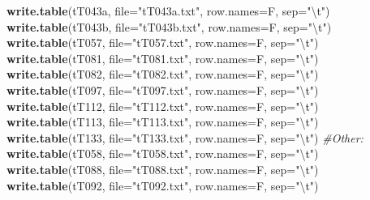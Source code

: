 \documentclass[
]{article}
\newenvironment{Shaded}{\begin{snugshade}}{\end{snugshade}}
\newcommand{\CharTok}[1]{\textcolor[rgb]{0.31,0.60,0.02}{#1}}
\newcommand{\CommentTok}[1]{\textcolor[rgb]{0.56,0.35,0.01}{\textit{#1}}}
\newcommand{\DataTypeTok}[1]{\textcolor[rgb]{0.13,0.29,0.53}{#1}}
\newcommand{\KeywordTok}[1]{\textcolor[rgb]{0.13,0.29,0.53}{\textbf{#1}}}
\newcommand{\NormalTok}[1]{#1}
\newcommand{\StringTok}[1]{\textcolor[rgb]{0.31,0.60,0.02}{#1}}
\begin{document}
\begin{Shaded}
\begin{Highlighting}[]
\KeywordTok{write.table}\NormalTok{(tT043a, }\DataTypeTok{file=}\StringTok{"tT043a.txt"}\NormalTok{, }\DataTypeTok{row.names=}\NormalTok{F, }\DataTypeTok{sep=}\StringTok{"}\CharTok{\textbackslash{}t}\StringTok{"}\NormalTok{)}
\KeywordTok{write.table}\NormalTok{(tT043b, }\DataTypeTok{file=}\StringTok{"tT043b.txt"}\NormalTok{, }\DataTypeTok{row.names=}\NormalTok{F, }\DataTypeTok{sep=}\StringTok{"}\CharTok{\textbackslash{}t}\StringTok{"}\NormalTok{)}
\KeywordTok{write.table}\NormalTok{(tT057, }\DataTypeTok{file=}\StringTok{"tT057.txt"}\NormalTok{, }\DataTypeTok{row.names=}\NormalTok{F, }\DataTypeTok{sep=}\StringTok{"}\CharTok{\textbackslash{}t}\StringTok{"}\NormalTok{)}
\KeywordTok{write.table}\NormalTok{(tT081, }\DataTypeTok{file=}\StringTok{"tT081.txt"}\NormalTok{, }\DataTypeTok{row.names=}\NormalTok{F, }\DataTypeTok{sep=}\StringTok{"}\CharTok{\textbackslash{}t}\StringTok{"}\NormalTok{)}
\KeywordTok{write.table}\NormalTok{(tT082, }\DataTypeTok{file=}\StringTok{"tT082.txt"}\NormalTok{, }\DataTypeTok{row.names=}\NormalTok{F, }\DataTypeTok{sep=}\StringTok{"}\CharTok{\textbackslash{}t}\StringTok{"}\NormalTok{)}
\KeywordTok{write.table}\NormalTok{(tT097, }\DataTypeTok{file=}\StringTok{"tT097.txt"}\NormalTok{, }\DataTypeTok{row.names=}\NormalTok{F, }\DataTypeTok{sep=}\StringTok{"}\CharTok{\textbackslash{}t}\StringTok{"}\NormalTok{)}
\KeywordTok{write.table}\NormalTok{(tT112, }\DataTypeTok{file=}\StringTok{"tT112.txt"}\NormalTok{, }\DataTypeTok{row.names=}\NormalTok{F, }\DataTypeTok{sep=}\StringTok{"}\CharTok{\textbackslash{}t}\StringTok{"}\NormalTok{)}
\KeywordTok{write.table}\NormalTok{(tT113, }\DataTypeTok{file=}\StringTok{"tT113.txt"}\NormalTok{, }\DataTypeTok{row.names=}\NormalTok{F, }\DataTypeTok{sep=}\StringTok{"}\CharTok{\textbackslash{}t}\StringTok{"}\NormalTok{)}
\KeywordTok{write.table}\NormalTok{(tT133, }\DataTypeTok{file=}\StringTok{"tT133.txt"}\NormalTok{, }\DataTypeTok{row.names=}\NormalTok{F, }\DataTypeTok{sep=}\StringTok{"}\CharTok{\textbackslash{}t}\StringTok{"}\NormalTok{)}
\CommentTok{#Other:}
\KeywordTok{write.table}\NormalTok{(tT058, }\DataTypeTok{file=}\StringTok{"tT058.txt"}\NormalTok{, }\DataTypeTok{row.names=}\NormalTok{F, }\DataTypeTok{sep=}\StringTok{"}\CharTok{\textbackslash{}t}\StringTok{"}\NormalTok{)}
\KeywordTok{write.table}\NormalTok{(tT088, }\DataTypeTok{file=}\StringTok{"tT088.txt"}\NormalTok{, }\DataTypeTok{row.names=}\NormalTok{F, }\DataTypeTok{sep=}\StringTok{"}\CharTok{\textbackslash{}t}\StringTok{"}\NormalTok{)}
\KeywordTok{write.table}\NormalTok{(tT092, }\DataTypeTok{file=}\StringTok{"tT092.txt"}\NormalTok{, }\DataTypeTok{row.names=}\NormalTok{F, }\DataTypeTok{sep=}\StringTok{"}\CharTok{\textbackslash{}t}\StringTok{"}\NormalTok{)}

\end{Highlighting}
\end{Shaded}
\end{document}
